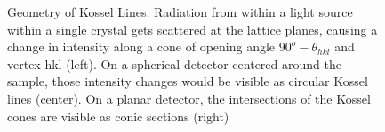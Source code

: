 \begin{figure}
\begin{subfigure}[b]{0.35\textwidth}
	\end{subfigure}
	\caption[Geometry of Kossel Lines]{Geometry of Kossel Lines: Radiation from within a light source within a single crystal gets scattered at the lattice planes, causing a change in intensity along a cone of opening angle $90^o-\theta_{hkl}$ and vertex hkl (left). On a spherical detector centered around the sample, those intensity changes would be visible as circular Kossel lines (center). On a planar detector, the intersections of the Kossel cones are visible as conic sections (right)}
	\label{fig:kossel}
\end{figure}
